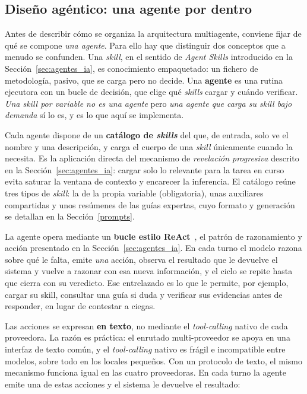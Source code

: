 \subsection{Diseño agéntico: una agente por dentro}
\label{subsec:diseno_agentico}

Antes de describir cómo se organiza la arquitectura multiagente, conviene fijar de qué se
compone \emph{una agente}. Para ello hay que distinguir dos conceptos que a menudo se
confunden. Una \textit{skill}, en el sentido de \textit{Agent Skills} introducido
en la Sección~\ref{sec:agentes_ia}, es conocimiento empaquetado: un fichero de
metodología, pasivo, que se carga pero no decide. Una \textbf{agente} es una rutina ejecutora con un bucle de decisión, que elige
qué \textit{skills} cargar y cuándo verificar. \textit{Una skill por variable no es una agente} pero
\textit{una agente que carga su skill bajo demanda} sí lo es, y es lo que aquí se
implementa.

Cada agente dispone de un \textbf{catálogo de \textit{skills}} del que, de entrada, solo ve
el nombre y una descripción, y carga el cuerpo de una \textit{skill} únicamente cuando la
necesita. Es la aplicación directa del mecanismo de \textit{revelación progresiva} descrito en la Sección~\ref{sec:agentes_ia}: cargar solo lo relevante
para la tarea en curso evita saturar la ventana de contexto y encarecer la
inferencia. El catálogo reúne tres tipos de \textit{skill}: la de la propia variable
(obligatoria), unas auxiliares compartidas y unos resúmenes de las guías expertas,
cuyo formato y generación se detallan en la Sección~\ref{prompts}.

La agente opera mediante un \textbf{bucle estilo ReAct}~\cite{yao2023react}, el
patrón de razonamiento y acción presentado en la Sección~\ref{sec:agentes_ia}. En
cada turno el modelo razona sobre qué le falta, emite \emph{una} acción, observa el
resultado que le devuelve el sistema y vuelve a razonar con esa nueva información,
y el ciclo se repite hasta que cierra con su veredicto. Ese entrelazado es lo que le permite, por ejemplo, cargar su skill,
consultar una guía si duda y verificar sus evidencias antes de responder, en lugar
de contestar a ciegas.

Las acciones se expresan \textbf{en texto}, no mediante el \textit{tool-calling}
nativo de cada proveedora. La razón es práctica: el enrutado multi-proveedor se
apoya en una interfaz de texto común, y el \textit{tool-calling} nativo es frágil e
incompatible entre modelos, sobre todo en los locales pequeños. Con un protocolo de
texto, el mismo mecanismo funciona igual en las cuatro proveedoras. En cada turno
la agente emite una de estas acciones y el sistema le devuelve el resultado:


